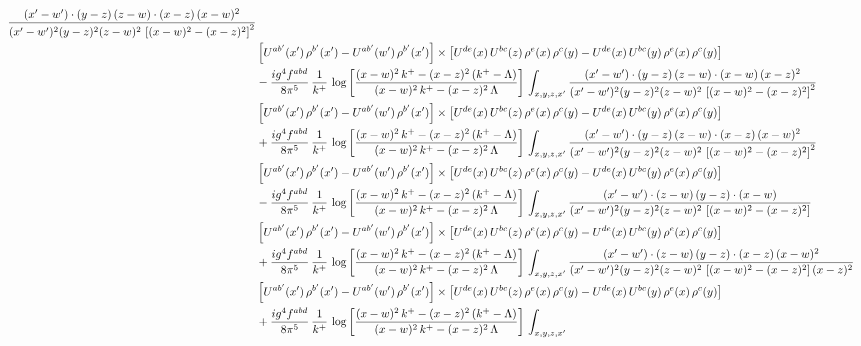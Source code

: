 \documentclass[9pt]{article}
\numberwithin{equation}{section}
\begin{document}
\begin{align}
\frac{(x'-w')\cdot(y-z)\,(z-w)\cdot(x-z)\,(x-w)^{2}}{(x'-w')^{2}(y-z)^{2}(z-w)^{2}\,\left[(x-w)^{2}-(x-z)^{2}\right]^{2}}\notag \\ & \left[U^{ab'}(x')\,\rho^{b'}(x')-U^{ab'}(w')\, \rho^{b'}(x')\right]\times \left[U^{de}(x)\,U^{bc}(z)\, \rho^{e}(x)\,\rho^{c}(y)-U^{de}(x)\,U^{bc}(y)\,\rho^{e}(x)\,\rho^{c}(y)\right]\notag \\ & 
-\frac{ig^{4}f^{abd}}{8\pi^{5}}\,\frac{1}{k^{+}}\,\log{\left[\frac{(x-w)^{2}\,k^{+}-(x-z)^{2}\,(k^{+}-\Lambda)}{(x-w)^{2}\,k^{+}-(x-z)^{2}\,\Lambda}\right]}\,\int_{x,y,z,x'}
\frac{(x'-w')\cdot(y-z)\,(z-w)\cdot(x-w)\,(x-z)^{2}}{(x'-w')^{2}(y-z)^{2}(z-w)^{2}\,\left[(x-w)^{2}-(x-z)^{2}\right]^{2}}\notag \\ & \left[U^{ab'}(x')\,\rho^{b'}(x')-U^{ab'}(w')\, \rho^{b'}(x')\right]\times \left[U^{de}(x)\,U^{bc}(z)\, \rho^{e}(x)\,\rho^{c}(y)-U^{de}(x)\,U^{bc}(y)\,\rho^{e}(x)\,\rho^{c}(y)\right]\notag \\ & +\frac{ig^{4}f^{abd}}{8\pi^{5}}\,\frac{1}{k^{+}}\,\log{\left[\frac{(x-w)^{2}\,k^{+}-(x-z)^{2}\,(k^{+}-\Lambda)}{(x-w)^{2}\,k^{+}-(x-z)^{2}\,\Lambda}\right]}\,\int_{x,y,z,x'}
\frac{(x'-w')\cdot(y-z)\,(z-w)\cdot(x-z)\,(x-w)^{2}}{(x'-w')^{2}(y-z)^{2}(z-w)^{2}\,\left[(x-w)^{2}-(x-z)^{2}\right]^{2}}\notag \\ 
&\left[U^{ab'}(x')\,\rho^{b'}(x')-U^{ab'}(w')\, \rho^{b'}(x')\right]\times \left[U^{de}(x)\,U^{bc}(z)\, \rho^{e}(x)\,\rho^{c}(y)-U^{de}(x)\,U^{bc}(y)\,\rho^{e}(x)\,\rho^{c}(y)\right]\notag \\ & -\frac{ig^{4}f^{abd}}{8\pi^{5}}\,\frac{1}{k^{+}}\,\log{\left[\frac{(x-w)^{2}\,k^{+}-(x-z)^{2}\,(k^{+}-\Lambda)}{(x-w)^{2}\,k^{+}-(x-z)^{2}\,\Lambda}\right]}\,\int_{x,y,z,x'}
\frac{(x'-w')\cdot(z-w)\,(y-z)\cdot(x-w)}{(x'-w')^{2}(y-z)^{2}(z-w)^{2}\,\left[(x-w)^{2}-(x-z)^{2}\right]}\notag \\ & \left[U^{ab'}(x')\,\rho^{b'}(x')-U^{ab'}(w')\, \rho^{b'}(x')\right]\times \left[U^{de}(x)\,U^{bc}(z)\, \rho^{e}(x)\,\rho^{c}(y)-U^{de}(x)\,U^{bc}(y)\,\rho^{e}(x)\,\rho^{c}(y)\right]\notag \\ &  +\frac{ig^{4}f^{abd}}{8\pi^{5}}\,\frac{1}{k^{+}}\,\log{\left[\frac{(x-w)^{2}\,k^{+}-(x-z)^{2}\,(k^{+}-\Lambda)}{(x-w)^{2}\,k^{+}-(x-z)^{2}\,\Lambda}\right]}\,\int_{x,y,z,x'}
\frac{(x'-w')\cdot(z-w)\,(y-z)\cdot(x-z)\,(x-w)^{2}}{(x'-w')^{2}(y-z)^{2}(z-w)^{2}\,\left[(x-w)^{2}-(x-z)^{2}\right](x-z)^{2}}\notag \\ & \left[U^{ab'}(x')\,\rho^{b'}(x')-U^{ab'}(w')\, \rho^{b'}(x')\right]\times \left[U^{de}(x)\,U^{bc}(z)\, \rho^{e}(x)\,\rho^{c}(y)-U^{de}(x)\,U^{bc}(y)\,\rho^{e}(x)\,\rho^{c}(y)\right]\notag \\ & +\frac{ig^{4}f^{abd}}{8\pi^{5}}\,\frac{1}{k^{+}}\,\log{\left[\frac{(x-w)^{2}\,k^{+}-(x-z)^{2}\,(k^{+}-\Lambda)}{(x-w)^{2}\,k^{+}-(x-z)^{2}\,\Lambda}\right]}\,\int_{x,y,z,x'}

\end{align}
\end{document}
